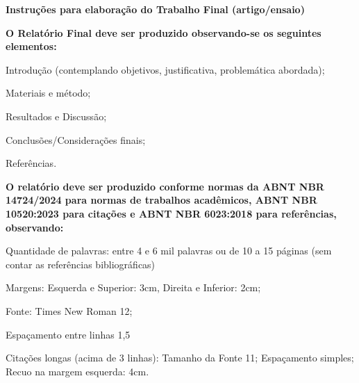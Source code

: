 
\begin{center}
\textbf{Instruções para elaboração do Trabalho Final (artigo/ensaio)}
\end{center}
\bigskip

\noindent\textbf{O Relatório Final deve ser produzido observando-se os seguintes elementos:}
\begin{taglist}
  \item Introdução (contemplando objetivos, justificativa, problemática abordada);
  \item Materiais e método;
  \item Resultados e Discussão;
  \item Conclusões/Considerações finais;
  \item Referências.
\end{taglist}

\bigskip
\noindent\textbf{O relatório deve ser produzido conforme normas da ABNT NBR 14724/2024 para normas de trabalhos acadêmicos, ABNT NBR 10520:2023 para citações e ABNT NBR 6023:2018 para referências, observando:}
\begin{taglist}
  \item Quantidade de palavras: entre 4 e 6 mil palavras ou de 10 a 15 páginas (sem contar as referências bibliográficas)
  \item Margens: Esquerda e Superior: 3cm, Direita e Inferior: 2cm;
  \item Fonte: Times New Roman 12;
  \item Espaçamento entre linhas 1,5
  \item Citações longas (acima de 3 linhas): Tamanho da Fonte 11; Espaçamento simples; Recuo na margem esquerda: 4cm.
\end{taglist}

\bigskip
{}

